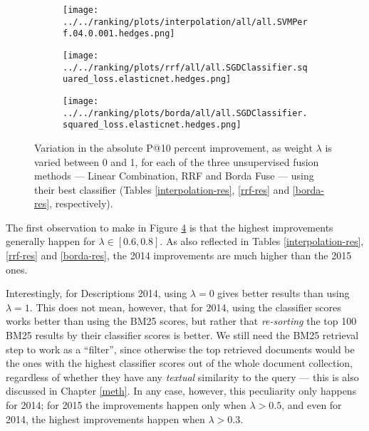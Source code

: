 \begin{figure}

\begin{subfigure}[b]{\textwidth}
 \centerline {
  \hspace*{1.5cm}\texttt{[image: ../../ranking/plots/interpolation/all/all.SVMPerf.04.0.001.hedges.png]}
  }
  \label{interp-weight}
\end{subfigure}
\begin{subfigure}[b]{\textwidth}
\centerline{
  \hspace*{1.5cm}\texttt{[image: ../../ranking/plots/rrf/all/all.SGDClassifier.squared\_loss.elasticnet.hedges.png]}
  }
  \label{rrf-weight}
\end{subfigure}
\begin{subfigure}[b]{\textwidth}
\centerline{
  \hspace*{1.5cm}\texttt{[image: ../../ranking/plots/borda/all/all.SGDClassifier.squared\_loss.elasticnet.hedges.png]}
  }
  \label{borda-weight}
\end{subfigure}

 \caption{Variation in the absolute P@10 percent improvement, as weight $\lambda$ is varied between 0 and 1, for each of the three unsupervised
fusion methods --- Linear Combination, RRF and Borda Fuse --- using their best classifier (Tables \ref{interpolation-res}, \ref{rrf-res}
and \ref{borda-res}, respectively).}
 \label{lambda-vary}

\end{figure}

The first observation to make in Figure \ref{lambda-vary} is that the highest improvements generally happen for $\lambda \in [0.6, 0.8]$.
As also reflected in Tables \ref{interpolation-res}, \ref{rrf-res} and \ref{borda-res}, the 2014 improvements are much higher than
the 2015 ones.

Interestingly, for Descriptions 2014, using $\lambda = 0$ gives better results
than using $\lambda=1$. This does not mean, however, that for 2014, using the classifier scores
works better than using the BM25 scores, but rather that
\emph{re-sorting} the top 100 BM25 results by their classifier scores is better.
We still need the BM25 retrieval step to work as a ``filter'',
since otherwise the top retrieved documents would be the ones with the highest classifier scores out of the whole document collection,
regardless of whether
they have any \emph{textual} similarity to the query --- this is also discussed in Chapter \ref{meth}.
In any case,  however, this peculiarity only happens for 2014; for 2015 the improvements happen only when $\lambda>0.5$,
and even for 2014, the highest improvements happen when $\lambda>0.3$.

